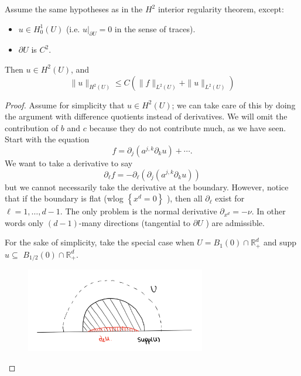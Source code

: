 \begin{theorem}
\label{thm: L^2-based boundary regularity}
Assume the same hypotheses as in the $H^{2}$ interior regularity theorem, except:
\begin{itemize}
    \item $u \in H_{0}^{1}(U)$ (i.e. $\left.u\right|_{\partial U}=0$ in the sense of traces).
    \item $\partial U$ is $C^{2}$.
\end{itemize}
Then $u \in H^{2}(U)$, and
$$
\|u\|_{H^{2}(U)} \leq C\left(\|f\|_{L^{2}(U)}+\|u\|_{L^{2}(U)}\right)
$$
\end{theorem}
\begin{proof}
 Assume for simplicity that $u \in H^{2}(U)$; we can take care of this by doing the argument with difference quotients instead of derivatives. We will omit the contribution of $b$ and $c$ because they do not contribute much, as we have seen. Start with the equation
$$
f=\partial_{j}\left(a^{j, k} \partial_{k} u\right)+\cdots .
$$
We want to take a derivative to say
$$
\partial_{\ell} f=-\partial_{\ell}\left(\partial_{j}\left(a^{j, k} \partial_{k} u\right)\right)
$$
but we cannot necessarily take the derivative at the boundary. However, notice that if the boundary is flat (wlog $\left\{x^{d}=0\right\}$ ), then all $\partial_{\ell}$ exist for $\ell=1, \ldots, d-1$. The only problem is the normal derivative $\partial_{x^{d}}=-\nu$. In other words only $(d-1)$-many directions (tangential to $\partial U$ ) are admissible.

For the sake of simplicity, take the special case when $U=B_{1}(0) \cap \mathbb{R}_{+}^{d}$ and supp $u \subseteq$ $B_{1 / 2}(0) \cap \mathbb{R}_{+}^{d}$.

\begin{figure}[H]
    \centering
    \includegraphics[width=0.7\textwidth]{figures/11-boundary.png}
\end{figure}


\end{proof}
